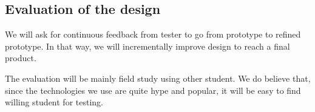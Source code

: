 \documentclass[11pt,a4paper]{article}
\begin{document}
\subsection{Evaluation of the design}

We will ask for continuous feedback from tester to go from prototype to refined prototype. In that way, we will incrementally improve design to reach a final product.

The evaluation will be mainly field study using other student. We do believe that, since the technologies we use are quite hype and popular, it will be easy to find willing student for testing.

\end{document}
